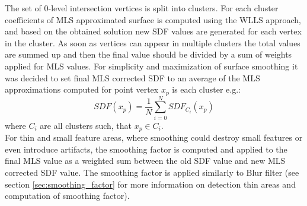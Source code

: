 The set of 0-level intersection vertices is split into clusters. For each cluster coefficients of MLS approximated surface is computed using the WLLS approach, and based on the obtained solution new SDF values are generated for each vertex in the cluster. As soon as vertices can appear in multiple clusters the total values are summed up and then the final value should be divided by a sum of weights applied for MLS values. For simplicity and maximization of surface smoothing it was decided to set final MLS corrected SDF to an average of the MLS approximations computed for point vertex $x_p$ is each cluster e.g.:
\begin{equation}
	SDF(x_p) = \dfrac{1}{N} \sum_{i = 0}^N{SDF_{C_i}(x_p)}
\end{equation}
where $C_i$ are all clusters such, that $x_p \in C_i$.\\

For thin and small feature areas, where smoothing could destroy small features or even introduce artifacts, the smoothing factor is computed and applied to the final MLS value as a weighted sum between the old SDF value and new MLS corrected SDF value. The smoothing factor is applied similarly to Blur filter (see section \ref{sec:smoothing_factor} for more information on detection thin areas and computation of smoothing factor).\\

